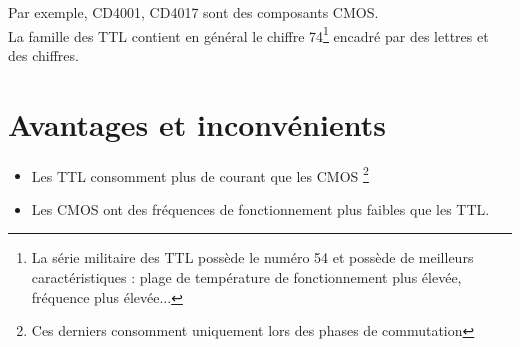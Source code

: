 Par exemple, CD4001, CD4017 sont des composants CMOS. \\



La famille des TTL contient en général le chiffre 74\footnote{La série militaire des TTL possède le numéro 54 et possède de meilleurs caractéristiques : plage de température de fonctionnement plus élevée, fréquence plus élevée...} encadré par des lettres et des chiffres. \\





\section{Avantages et inconvénients}

\begin{itemize}
    \item Les TTL consomment plus de courant que les CMOS \footnote{Ces derniers consomment uniquement lors des phases de commutation}
    \item Les CMOS ont des fréquences de fonctionnement plus faibles que les TTL.
\end{itemize}


